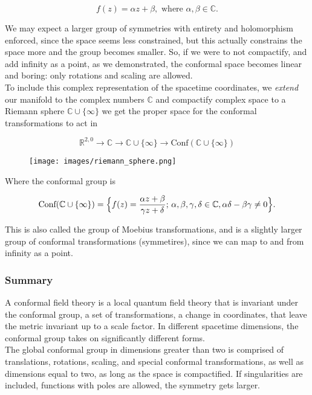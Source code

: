 \begin{equation}
f(z) = \alpha z + \beta, \text{ where } \alpha, \beta \in \mathbb{C}.
\end{equation}

\noindent We may expect a larger group of symmetries with entirety and holomorphism enforced, since the space seems less constrained, but this actually constrains the space more and the group becomes smaller. So, if we were to not compactify, and add infinity as a point, as we demonstrated, the conformal space becomes linear and boring: only rotations and scaling are allowed.\\

\noindent To include this complex representation of the spacetime coordinates, we \textit{extend} our manifold to the complex numbers $\mathbb{C}$ and compactify complex space to a Riemann sphere $\mathbb{C} \cup \{ \infty \}$ we get the proper space for the conformal transformations to act in

\begin{equation}
\mathbb{R}^{2,0} \rightarrow \mathbb{C} \rightarrow \mathbb{C} \cup \{\infty\} \rightarrow \text{Conf}(\mathbb{C} \cup \{\infty\} )
\end{equation}

\begin{figure}[H]
	\centering
	\texttt{[image: images/riemann\_sphere.png]} 
\end{figure} 

\noindent Where the conformal group is

\begin{equation}
\text{Conf}(\mathbb{C} \cup \{ \infty \} ) = \Big{\{} f(z) = \frac{\alpha z + \beta}{\gamma z + \delta}; \, \alpha, \beta, \gamma, \delta \in \mathbb{C}, \alpha\delta - \beta \gamma \ne 0 \Big{\}}.
\end{equation}

\noindent This is also called the group of Moebius transformations, and is a slightly larger group of conformal transformations (symmetires), since we can map to and from infinity as a point. \\

\subsubsection*{Summary}

\noindent A conformal field theory is a local quantum field theory that is invariant under the conformal group, a set of transformations, a change in coordinates, that leave the metric invariant up to a scale factor. In different spacetime dimensions, the conformal group takes on significantly different forms. \\

\noindent The global conformal group in dimensions greater than two is comprised of translations, rotations, scaling, and special conformal transformations, as well as dimensions equal to two, as long as the space is compactified. If singularities are included, functions with poles are allowed, the symmetry gets larger.
